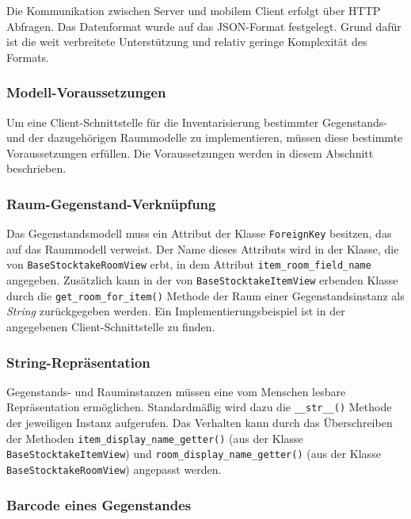 Die Kommunikation zwischen Server und mobilem Client erfolgt über HTTP
Abfragen. Das Datenformat wurde auf das JSON-Format
\cite{json-format-doku} festgelegt. Grund dafür ist die weit verbreitete
Unterstützung und relativ geringe Komplexität des Formats.

\hypertarget{modell-voraussetzungen}{%
\subsubsection{Modell-Voraussetzungen}\label{modell-voraussetzungen}}

Um eine Client-Schnittstelle für die Inventarisierung bestimmter
Gegenstands- und der dazugehörigen Raummodelle zu implementieren, müssen
diese bestimmte Voraussetzungen erfüllen. Die Voraussetzungen werden in
diesem Abschnitt beschrieben.

\subsubsection*{Raum-Gegenstand-Verknüpfung}

Das Gegenstandsmodell muss ein Attribut der Klasse \texttt{ForeignKey}
besitzen, das auf das Raummodell verweist. Der Name dieses Attributs
wird in der Klasse, die von \texttt{BaseStocktakeRoomView} erbt, in dem
Attribut \texttt{item\_room\_field\_name} angegeben. Zusätzlich kann in
der von \texttt{BaseStocktakeItemView} erbenden Klasse durch die
\texttt{get\_room\_for\_item()} Methode der Raum einer
Gegenstandsinstanz als \emph{String}
 zurückgegeben
werden. Ein Implementierungsbeispiel ist in der \oa{} angegebenen
Client-Schnittstelle zu finden.

\subsubsection*{String-Repräsentation}

Gegenstands- und Rauminstanzen müssen eine vom Menschen lesbare
Repräsentation ermöglichen. Standardmäßig wird dazu die
\texttt{\_\_str\_\_()} Methode der jeweiligen Instanz aufgerufen. Das
Verhalten kann durch das Überschreiben der Methoden
\texttt{item\_display\_name\_getter()} (aus der Klasse
\texttt{BaseStocktakeItemView}) und
\texttt{room\_display\_name\_getter()} (aus der Klasse
\texttt{BaseStocktakeRoomView}) angepasst werden.

\subsubsection*{Barcode eines Gegenstandes}\label{barcode-eines-gegenstandes}

